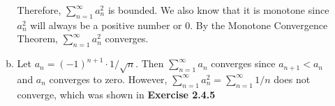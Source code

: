 \documentclass{article}
\begin{document}
\begin{enumerate}
\begin{enumerate}[(a)]
  Therefore, \(\sum_{n = 1}^{\infty} a_{n}^{2}\) is bounded. We also know that it is monotone
  since \(a_{n}^{2}\) will always be a positive number or 0. By the Monotone Convergence
  Theorem, \(\sum_{n = 1}^{\infty} a_{n}^{2}\) converges.
\item Let \(a_{n} = (-1)^{n + 1} \cdot 1 / \sqrt{n}\). Then \(\sum_{n = 1}^{\infty} a_{n}\)
  converges since \(a_{n+1} < a_{n}\) and \(a_{n}\) converges to zero. However,
  \(\sum_{n = 1}^{\infty} a_{n}^{2} = \sum_{n = 1}^{\infty} 1 / n\) does not converge, which was
  shown in \textbf{Exercise 2.4.5}
\end{enumerate}
\end{enumerate}
\end{document}
